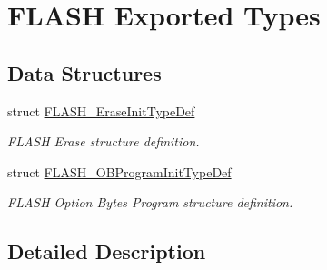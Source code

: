 \hypertarget{group___f_l_a_s_h_ex___exported___types}{}\section{F\+L\+A\+SH Exported Types}
\label{group___f_l_a_s_h_ex___exported___types}
\subsection*{Data Structures}
\begin{DoxyCompactItemize}
\item 
struct \hyperlink{struct_f_l_a_s_h___erase_init_type_def}{F\+L\+A\+S\+H\+\_\+\+Erase\+Init\+Type\+Def}
\begin{DoxyCompactList}\small\item\em F\+L\+A\+SH Erase structure definition. \end{DoxyCompactList}\item 
struct \hyperlink{struct_f_l_a_s_h___o_b_program_init_type_def}{F\+L\+A\+S\+H\+\_\+\+O\+B\+Program\+Init\+Type\+Def}
\begin{DoxyCompactList}\small\item\em F\+L\+A\+SH Option Bytes Program structure definition. \end{DoxyCompactList}\end{DoxyCompactItemize}


\subsection{Detailed Description}
